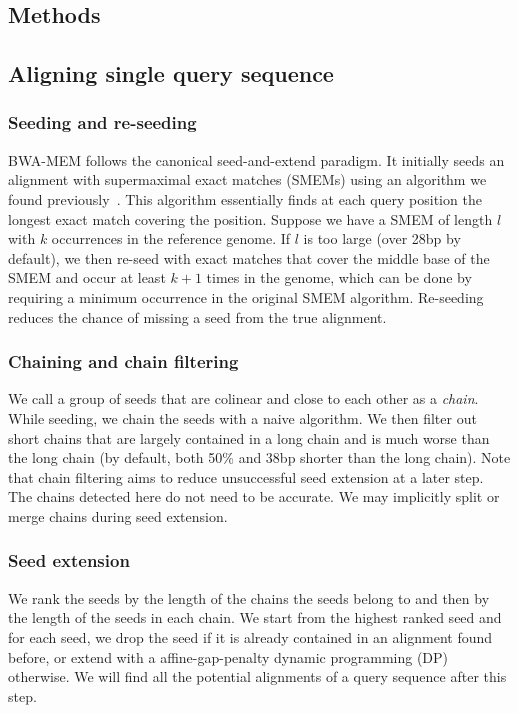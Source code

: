 \documentclass{bioinfo}
\begin{document}
\begin{methods}

\section{Methods}

\subsection{Aligning single query sequence}

\subsubsection{Seeding and re-seeding} BWA-MEM follows the canonical
seed-and-extend paradigm. It initially seeds an alignment with supermaximal
exact matches (SMEMs) using an algorithm we found previously~\citep[Algorithm 5]{Li:2012fk}. This algorithm
essentially finds at each query position the longest exact match covering the
position. Suppose we have a SMEM of length $l$ with $k$ occurrences in the
reference genome. If $l$ is too large (over 28bp by default), we then re-seed
with exact matches that cover the middle base of the SMEM and occur at least
$k+1$ times in the genome, which can be done by requiring a minimum occurrence
in the original SMEM algorithm. Re-seeding reduces the chance of missing a seed
from the true alignment.

\subsubsection{Chaining and chain filtering} We call a group of seeds that are
colinear and close to each other as a \emph{chain}. While seeding, we chain
the seeds with a naive algorithm. We then filter out short chains that are
largely contained in a long chain and is much worse than the long chain (by
default, both 50\% and 38bp shorter than the long chain). Note that chain
filtering aims to reduce unsuccessful seed extension at a later step. The
chains detected here do not need to be accurate. We may implicitly split or
merge chains during seed extension.

\subsubsection{Seed extension} We rank the seeds by the length of the chains
the seeds belong to and then by the length of the seeds in each chain. We start
from the highest ranked seed and for each seed, we drop the seed if it is
already contained in an alignment found before, or extend with a
affine-gap-penalty dynamic programming (DP) otherwise. We will find all the
potential alignments of a query sequence after this step.


\end{methods}
\end{document}
